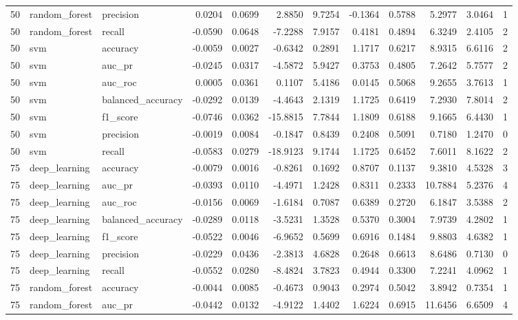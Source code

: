 \begin{tabular}{rllrrrrrrrrl}
50 & random_forest & precision & 0.0204 & 0.0699 & 2.8850 & 9.7254 & -0.1364 & 0.5788 & 5.2977 & 3.0464 & 1 \\
50 & random_forest & recall & -0.0590 & 0.0648 & -7.2288 & 7.9157 & 0.4181 & 0.4894 & 6.3249 & 2.4105 & 2 \\
50 & svm & accuracy & -0.0059 & 0.0027 & -0.6342 & 0.2891 & 1.1717 & 0.6217 & 8.9315 & 6.6116 & 2 \\
50 & svm & auc_pr & -0.0245 & 0.0317 & -4.5872 & 5.9427 & 0.3753 & 0.4805 & 7.2642 & 5.7577 & 2 \\
50 & svm & auc_roc & 0.0005 & 0.0361 & 0.1107 & 5.4186 & 0.0145 & 0.5068 & 9.2655 & 3.7613 & 1 \\
50 & svm & balanced_accuracy & -0.0292 & 0.0139 & -4.4643 & 2.1319 & 1.1725 & 0.6419 & 7.2930 & 7.8014 & 2 \\
50 & svm & f1_score & -0.0746 & 0.0362 & -15.8815 & 7.7844 & 1.1809 & 0.6188 & 9.1665 & 6.4430 & 1 \\
50 & svm & precision & -0.0019 & 0.0084 & -0.1847 & 0.8439 & 0.2408 & 0.5091 & 0.7180 & 1.2470 & 0 \\
50 & svm & recall & -0.0583 & 0.0279 & -18.9123 & 9.1744 & 1.1725 & 0.6452 & 7.6011 & 8.1622 & 2 \\
75 & deep_learning & accuracy & -0.0079 & 0.0016 & -0.8261 & 0.1692 & 0.8707 & 0.1137 & 9.3810 & 4.5328 & 3 \\
75 & deep_learning & auc_pr & -0.0393 & 0.0110 & -4.4971 & 1.2428 & 0.8311 & 0.2333 & 10.7884 & 5.2376 & 4 \\
75 & deep_learning & auc_roc & -0.0156 & 0.0069 & -1.6184 & 0.7087 & 0.6389 & 0.2720 & 6.1847 & 3.5388 & 2 \\
75 & deep_learning & balanced_accuracy & -0.0289 & 0.0118 & -3.5231 & 1.3528 & 0.5370 & 0.3004 & 7.9739 & 4.2802 & 1 \\
75 & deep_learning & f1_score & -0.0522 & 0.0046 & -6.9652 & 0.5699 & 0.6916 & 0.1484 & 9.8803 & 4.6382 & 1 \\
75 & deep_learning & precision & -0.0229 & 0.0436 & -2.3813 & 4.6828 & 0.2648 & 0.6613 & 8.6486 & 0.7130 & 0 \\
75 & deep_learning & recall & -0.0552 & 0.0280 & -8.4824 & 3.7823 & 0.4944 & 0.3300 & 7.2241 & 4.0962 & 1 \\
75 & random_forest & accuracy & -0.0044 & 0.0085 & -0.4673 & 0.9043 & 0.2974 & 0.5042 & 3.8942 & 0.7354 & 1 \\
75 & random_forest & auc_pr & -0.0442 & 0.0132 & -4.9122 & 1.4402 & 1.6224 & 0.6915 & 11.6456 & 6.6509 & 4 \\

\end{tabular}
